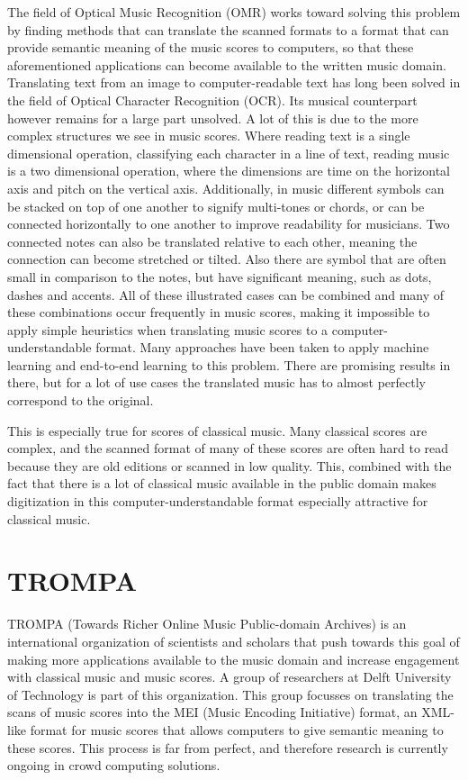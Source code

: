 The field of Optical Music Recognition (OMR) works toward solving this problem by finding methods that can translate the scanned formats to a format that can provide semantic meaning of the music scores to computers, so that these aforementioned applications can become available to the written music domain. Translating text from an image to computer-readable text has long been solved in the field of Optical Character Recognition (OCR)\citeneeded. Its musical counterpart however remains for a large part unsolved. A lot of this is due to the more complex structures we see in music scores. Where reading text is a single dimensional operation, classifying each character in a line of text, reading music is a two dimensional operation, where the dimensions are time on the horizontal axis and pitch on the vertical axis. Additionally, in music different symbols can be stacked on top of one another to signify multi-tones or chords, or can be connected horizontally to one another to improve readability for musicians. Two connected notes can also be translated relative to each other, meaning the connection can become stretched or tilted. Also there are symbol that are often small in comparison to the notes, but have significant meaning, such as dots, dashes and accents.  All of these illustrated cases can be combined and many of these combinations occur frequently in music scores, making it impossible to apply simple heuristics when translating music scores to a computer-understandable format. Many approaches have been taken to apply machine learning and end-to-end learning \citeneeded to this problem. There are promising results in there, but for a lot of use cases the translated music has to almost perfectly correspond to the original. 

This is especially true for scores of classical music. Many classical scores are complex, and the scanned format of many of these scores are often hard to read because they are old editions or scanned in low quality. This, combined with the fact that there is a lot of classical music available in the public domain makes digitization in this computer-understandable format especially attractive for classical music.

\section{TROMPA}
TROMPA (Towards Richer Online Music Public-domain Archives) is an international organization of scientists and scholars that push towards this goal of making more applications available to the music domain and increase engagement with classical music and music scores\citeneeded {}. A group of researchers at Delft University of Technology is part of this organization. This group focusses on translating the scans of music scores into the MEI (Music Encoding Initiative) format, an XML-like format for music scores that allows computers to give semantic meaning to these scores\citeneeded. This process is far from perfect, and therefore research is currently ongoing in crowd computing solutions.

